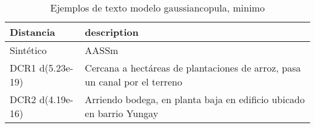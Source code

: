 \begin{table}[H]
\centering
\fontsize{10}{14}\selectfont
\caption{Ejemplos de texto modelo gaussiancopula, minimo}
\label{table-example-economicos-b-3-gaussiancopula-min-text}
\begin{tabular}{|l|m{35em}|}
\hline
\rowcolor[gray]{0.8}
Distancia & description \\
\hline Sintético & AASSm \\
\hline DCR1 d(5.23e-19) & Cercana a hect\'areas  de plantaciones de arroz, pasa un canal por el terreno \\
\hline DCR2 d(4.19e-16) & Arriendo bodega, en planta baja en edificio ubicado en barrio Yungay \\
\hline
\end{tabular}
\end{table}
